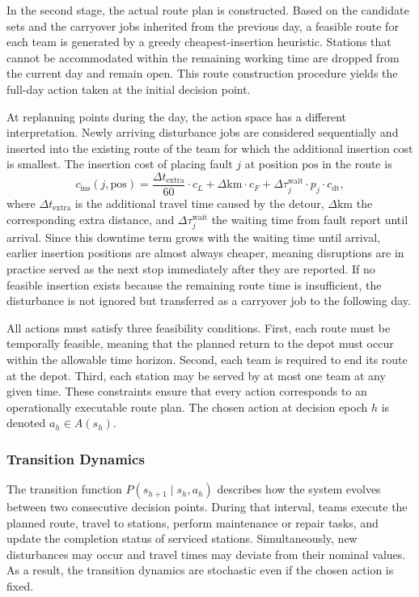 \documentclass[12pt,oneside]{article}
\begin{document}
In the second stage, the actual route plan is constructed. Based on the candidate sets and the carryover jobs inherited from the previous day, a feasible route for each team is generated by a greedy cheapest-insertion heuristic. Stations that cannot be accommodated within the remaining working time are dropped from the current day and remain open. This route construction procedure yields the full-day action taken at the initial decision point.

At replanning points during the day, the action space has a different interpretation. Newly arriving disturbance jobs are considered sequentially and inserted into the existing route of the team for which the additional insertion cost is smallest. The insertion cost of placing fault $j$ at position $\mathrm{pos}$ in the route is
\[
  c_{\mathrm{ins}}(j,\mathrm{pos}) = \frac{\Delta t_{\mathrm{extra}}}{60} \cdot c_L
    + \Delta\mathrm{km} \cdot c_F
    + \Delta\tau_j^{\mathrm{wait}} \cdot p_j \cdot c_{\mathrm{dt}},
\]
where $\Delta t_{\mathrm{extra}}$ is the additional travel time caused by the detour, $\Delta\mathrm{km}$ the corresponding extra distance, and $\Delta\tau_j^{\mathrm{wait}}$ the waiting time from fault report until arrival. Since this downtime term grows with the waiting time until arrival, earlier insertion positions are almost always cheaper, meaning disruptions are in practice served as the next stop immediately after they are reported. If no feasible insertion exists because the remaining route time is insufficient, the disturbance is not ignored but transferred as a carryover job to the following day.

All actions must satisfy three feasibility conditions. First, each route must be temporally feasible, meaning that the planned return to the depot must occur within the allowable time horizon. Second, each team is required to end its route at the depot. Third, each station may be served by at most one team at any given time. These constraints ensure that every action corresponds to an operationally executable route plan. The chosen action at decision epoch $h$ is denoted $a_h \in A(s_h)$.
\subsubsection{Transition Dynamics}
The transition function $P(s_{h+1} \mid s_h, a_h)$ describes how the system evolves between two consecutive decision points. During that interval, teams execute the planned route, travel to stations, perform maintenance or repair tasks, and update the completion status of serviced stations. Simultaneously, new disturbances may occur and travel times may deviate from their nominal values. As a result, the transition dynamics are stochastic even if the chosen action is fixed.
\end{document}
